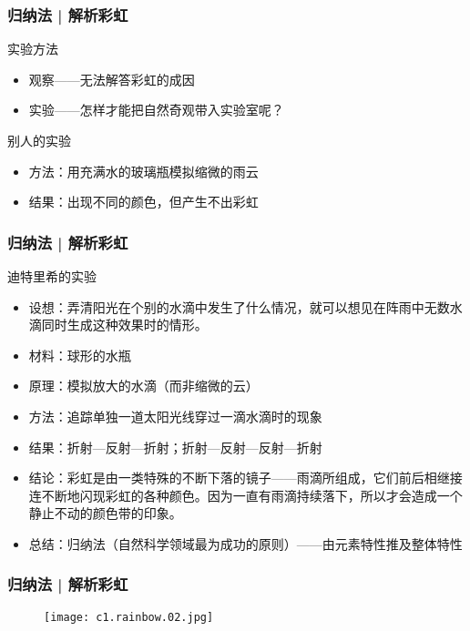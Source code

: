 \begin{frame}
  \frametitle{归纳法 | 解析彩虹}
  \begin{block}{实验方法}
    \begin{itemize}
      \item 观察——无法解答彩虹的成因
      \item 实验——怎样才能把自然奇观带入实验室呢？
    \end{itemize}
  \end{block}
  \pause
  \begin{block}{别人的实验}
    \begin{itemize}
      \item 方法：用充满水的玻璃瓶模拟缩微的雨云
      \item 结果：出现不同的颜色，但产生不出彩虹
    \end{itemize}
  \end{block}
\end{frame}

\begin{frame}
  \frametitle{归纳法 | 解析彩虹}
  \begin{block}{迪特里希的实验}
    \begin{itemize}
      \item 设想：弄清阳光在个别的水滴中发生了什么情况，就可以想见在阵雨中无数水滴同时生成这种效果时的情形。
      \item 材料：球形的水瓶
      \item 原理：模拟放大的水滴（而非缩微的云）
      \item 方法：追踪单独一道太阳光线穿过一滴水滴时的现象
      \item 结果：折射—反射—折射；折射—反射—反射—折射
      \item 结论：彩虹是由一类特殊的不断下落的镜子——雨滴所组成，它们前后相继接连不断地闪现彩虹的各种颜色。因为一直有雨滴持续落下，所以才会造成一个静止不动的颜色带的印象。
      \item 总结：\alert{归纳法}（自然科学领域最为成功的原则）——由元素特性推及整体特性
    \end{itemize}
  \end{block}
\end{frame}

\begin{frame}
  \frametitle{归纳法 | 解析彩虹}
  \begin{figure}
    \centering
    \texttt{[image: c1.rainbow.02.jpg]}
  \end{figure}
\end{frame}

